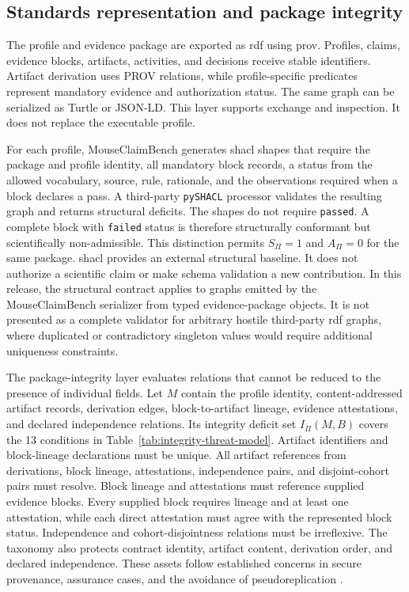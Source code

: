 \subsection{Standards representation and package integrity}
\label{subsec:standards-integrity}

The profile and evidence package are exported as \ac{rdf} using \ac{prov}. Profiles, claims, evidence blocks, artifacts, activities, and decisions receive stable identifiers. Artifact derivation uses PROV relations, while profile-specific predicates represent mandatory evidence and authorization status. The same graph can be serialized as Turtle or JSON-LD. This layer supports exchange and inspection. It does not replace the executable profile.

For each profile, MouseClaimBench generates \ac{shacl} shapes that require the package and profile identity, all mandatory block records, a status from the allowed vocabulary, source, rule, rationale, and the observations required when a block declares a pass. A third-party \texttt{pySHACL} processor validates the resulting graph and returns structural deficits. The shapes do not require \texttt{passed}. A complete block with \texttt{failed} status is therefore structurally conformant but scientifically non-admissible. This distinction permits $S_{\Pi}=1$ and $A_{\Pi}=0$ for the same package. \ac{shacl} provides an external structural baseline. It does not authorize a scientific claim or make schema validation a new contribution. In this release, the structural contract applies to graphs emitted by the MouseClaimBench serializer from typed evidence-package objects. It is not presented as a complete validator for arbitrary hostile third-party \ac{rdf} graphs, where duplicated or contradictory singleton values would require additional uniqueness constraints.

The package-integrity layer evaluates relations that cannot be reduced to the presence of individual fields. Let $M$ contain the profile identity, content-addressed artifact records, derivation edges, block-to-artifact lineage, evidence attestations, and declared independence relations. Its integrity deficit set $I_{\Pi}(M,B)$ covers the 13 conditions in Table~\ref{tab:integrity-threat-model}. Artifact identifiers and block-lineage declarations must be unique. All artifact references from derivations, block lineage, attestations, independence pairs, and disjoint-cohort pairs must resolve. Block lineage and attestations must reference supplied evidence blocks. Every supplied block requires lineage and at least one attestation, while each direct attestation must agree with the represented block status. Independence and cohort-disjointness relations must be irreflexive. The taxonomy also protects contract identity, artifact content, derivation order, and declared independence. These assets follow established concerns in secure provenance, assurance cases, and the avoidance of pseudoreplication \citep{hasan2009provenance,mohamad2021assurance,lazic2010pseudoreplication}.

